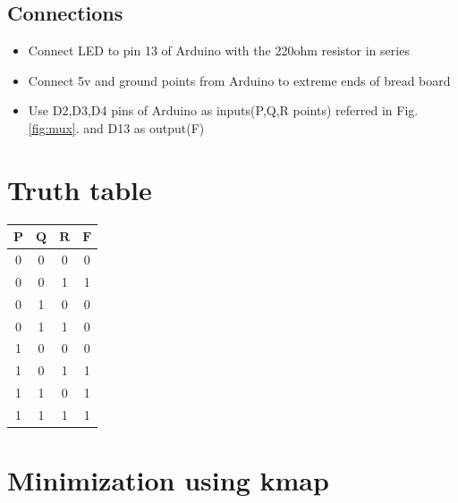 \documentclass[journal,10pt,twocolumn]{article}
\begin{document}
\subsection*{\normalsize Connections}
\begin{itemize}
\item Connect LED to pin 13 of Arduino with the 220ohm resistor in series
\item Connect 5v and ground points from Arduino to extreme ends of bread board
\item Use D2,D3,D4 pins of Arduino as inputs(P,Q,R points) referred in Fig.\ref{fig:mux}.  and D13 as output(F)
\end{itemize}

\section*{\large Truth table}
{
\centering
\begin{tabular}{|c|c|c|c|}
\hline
$\boldsymbol{P}$&$\boldsymbol{Q}$&$\boldsymbol{R}$&$\boldsymbol{F}$\\
\hline
0&0&0&0\\%
\hline
0&0&1&1\\%
\hline
0&1&0&0\\%
\hline
0&1&1&0\\%
\hline
1&0&0&0\\%
\hline
1&0&1&1\\%
\hline
1&1&0&1\\%
\hline
1&1&1&1\\%
\hline
\end{tabular}\par
}

\section*{\large Minimization using kmap}
\begin{kvmap}
\end{kvmap}
\end{document}
